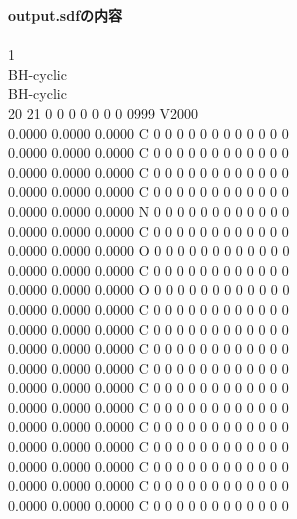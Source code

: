 \documentclass[11pt,titlepage,dvipdfmx,twoside]{jarticle}
\begin{document}
\begin{oframed}
{\bf output.sdfの内容}\\\\
{1 \\
BH-cyclic \\
BH-cyclic \\
 20 21  0  0  0  0  0  0  0  0999 V2000 \\
    0.0000    0.0000    0.0000  C  0  0  0  0  0  0  0  0  0  0  0  0 \\
    0.0000    0.0000    0.0000  C  0  0  0  0  0  0  0  0  0  0  0  0 \\
    0.0000    0.0000    0.0000  C  0  0  0  0  0  0  0  0  0  0  0  0 \\
    0.0000    0.0000    0.0000  C  0  0  0  0  0  0  0  0  0  0  0  0 \\
    0.0000    0.0000    0.0000  N  0  0  0  0  0  0  0  0  0  0  0  0 \\
    0.0000    0.0000    0.0000  C  0  0  0  0  0  0  0  0  0  0  0  0 \\
    0.0000    0.0000    0.0000  O  0  0  0  0  0  0  0  0  0  0  0  0 \\
    0.0000    0.0000    0.0000  C  0  0  0  0  0  0  0  0  0  0  0  0 \\
    0.0000    0.0000    0.0000  O  0  0  0  0  0  0  0  0  0  0  0  0 \\
    0.0000    0.0000    0.0000  C  0  0  0  0  0  0  0  0  0  0  0  0 \\
    0.0000    0.0000    0.0000  C  0  0  0  0  0  0  0  0  0  0  0  0 \\
    0.0000    0.0000    0.0000  C  0  0  0  0  0  0  0  0  0  0  0  0 \\
    0.0000    0.0000    0.0000  C  0  0  0  0  0  0  0  0  0  0  0  0 \\
    0.0000    0.0000    0.0000  C  0  0  0  0  0  0  0  0  0  0  0  0 \\
    0.0000    0.0000    0.0000  C  0  0  0  0  0  0  0  0  0  0  0  0 \\
    0.0000    0.0000    0.0000  C  0  0  0  0  0  0  0  0  0  0  0  0 \\
    0.0000    0.0000    0.0000  C  0  0  0  0  0  0  0  0  0  0  0  0 \\
    0.0000    0.0000    0.0000  C  0  0  0  0  0  0  0  0  0  0  0  0 \\
    0.0000    0.0000    0.0000  C  0  0  0  0  0  0  0  0  0  0  0  0 \\
    0.0000    0.0000    0.0000  C  0  0  0  0  0  0  0  0  0  0  0  0 \\
}
\end{oframed}
\end{document}
